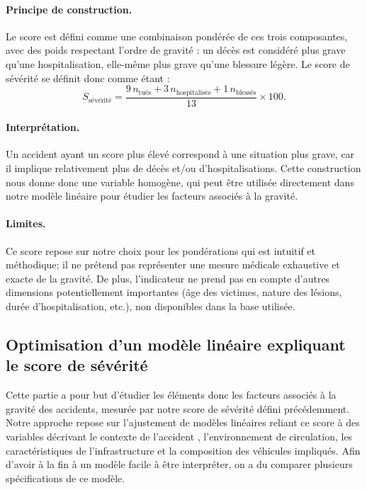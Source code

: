 \documentclass[11pt,a4paper]{article}
\begin{document}
\paragraph{Principe de construction.}
Le score est défini comme une combinaison pondérée de ces trois composantes, avec des poids respectant
l'ordre de gravité : un décès est considéré plus grave qu’une hospitalisation, elle-même plus grave
qu’une blessure légère.
Le score de sévérité se définit donc comme étant :
\begin{equation}
S_{\text{sévérité}} =
\frac{9\,n_{\text{tués}} + 3\,n_{\text{hospitalisés}} + 1\,n_{\text{blessés}}}{13}\times 100 .
\label{eq:score_severite}
\end{equation}

\paragraph{Interprétation.}
Un accident ayant un score plus élevé correspond à une situation plus grave, car il implique relativement
plus de décès et/ou d’hospitalisations. Cette construction nous donne donc  une variable homogène, qui peut être utilisée directement dans notre modèle linéaire pour étudier les facteurs associés à la gravité.                                                                               
\paragraph{Limites.}
Ce score repose sur notre choix pour les pondérations qui est intuitif et méthodique; il ne prétend
pas représenter une mesure médicale exhaustive et exacte de la gravité. De plus, l’indicateur ne prend pas en compte
d’autres dimensions potentiellement importantes (âge des victimes, nature des lésions, durée
d’hospitalisation, etc.), non disponibles dans la base utilisée.

\subsection{Optimisation d’un modèle linéaire expliquant le score de sévérité}

Cette partie a pour but d'étudier les éléments donc les facteurs associés à la gravité des accidents, mesurée par notre score de
sévérité défini précédemment. Notre approche repose sur l’ajustement de modèles linéaires reliant ce
score à des variables décrivant le contexte de l’accident \citep{Saporta2011}, l’environnement de circulation, les
caractéristiques de l’infrastructure et la composition des véhicules impliqués. Afin d’avoir à la fin à un
modèle facile à être interpréter, on a du comparer plusieurs spécifications de ce modèle.
\end{document}
